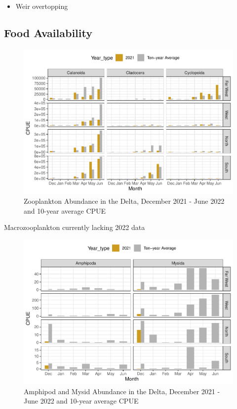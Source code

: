 \documentclass[
]{book}
\providecommand{\tightlist}{%
  \setlength{\itemsep}{0pt}\setlength{\parskip}{0pt}}
\theoremstyle{definition}
\theoremstyle{definition}
\theoremstyle{definition}
\theoremstyle{definition}
\theoremstyle{remark}
\begin{document}
\begin{itemize}
\tightlist
\item
  Weir overtopping
\end{itemize}

\hypertarget{food-availability}{%
\subsection{Food Availability}\label{food-availability}}

\begin{figure}
\centering
\includegraphics{_main_files/figure-latex/meso-fig-1.pdf}
\caption{\label{fig:meso-fig}Zooplankton Abundance in the Delta, December 2021 - June 2022 and 10-year average CPUE}
\end{figure}

Macrozooplankton currently lacking 2022 data

\begin{figure}
\centering
\includegraphics{_main_files/figure-latex/macro-fig-1.pdf}
\caption{\label{fig:macro-fig}Amphipod and Mysid Abundance in the Delta, December 2021 - June 2022 and 10-year average CPUE}
\end{figure}
\end{document}
